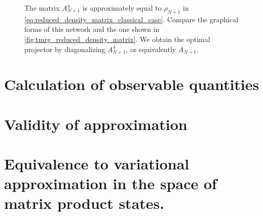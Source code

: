 \begin{figure}
  
  \caption{The matrix $A_{N+1}^4$ is approximately equal to $\rho_{N+1}$ in
  \autoref{eq:reduced_density_matrix_classical_case}. Compare the graphical forms of this
  network and the one shown in \autoref{fig:tmrg_reduced_density_matrix}. We obtain the
  optimal projector by diagonalizing $A_{N + 1}^4$, or equivalently $A_{N+1}$.}
  \label{fig:ctmrg_reduced_density_matrix}
\end{figure}



\section{Calculation of observable quantities}


\section{Validity of approximation}


\section{Equivalence to variational approximation in the space of matrix product states.}

